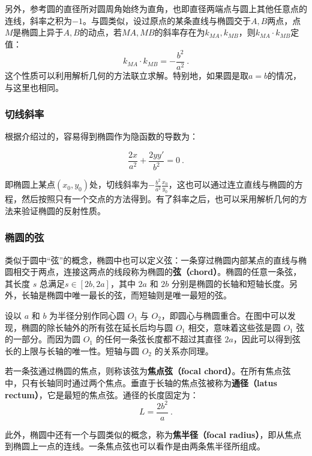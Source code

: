 另外，参考圆的直径所对圆周角始终为直角，也即直径两端点与圆上其他任意点的连线，斜率之积为$-1$。与圆类似，设过原点的某条直线与椭圆交于$A,B$两点，点$M$是椭圆上异于$A,B$的动点，若$MA,MB$的斜率存在为$k_{MA},k_{MB}$，则$k_{MA}\cdot k_{MB}$定值：
\begin{equation}
k_{MA} \cdot k_{MB} = -\frac{b^2}{a^2}~.
\end{equation}
这个性质可以利用解析几何的方法联立求解。特别地，如果圆是取$a=b$的情况，与这里也相同。

\subsubsection{切线斜率}

根据介绍过的，容易得到椭圆作为隐函数的导数为：

\begin{equation}
\frac{2x}{a^2} + \frac{2yy'}{b^2} = 0~.
\end{equation}

即椭圆上某点$(x_0,y_0)$处，切线斜率为$\displaystyle-\frac{b^2}{a^2}\frac{x_0}{y_0}$，这也可以通过连立直线与椭圆的方程，然后按照只有一个交点的方法得到。有了斜率之后，也可以采用解析几何的方法来验证椭圆的反射性质。

\subsubsection{椭圆的弦}

类似于圆中“弦”的概念，椭圆中也可以定义弦：一条穿过椭圆内部某点的直线与椭圆相交于两点，连接这两点的线段称为椭圆的\textbf{弦（chord）}。椭圆的任意一条弦，其长度 $s$ 总满足$s \in [2b, 2a]$，其中 $2a$ 和 $2b$ 分别是椭圆的长轴和短轴长度。另外，长轴是椭圆中唯一最长的弦，而短轴则是唯一最短的弦。


设以 $a$ 和 $b$ 为半径分别作同心圆 $O_1$ 与 $O_2$，即圆心与椭圆重合。在图中可以发现，椭圆的除长轴外的所有弦在延长后均与圆 $O_1$ 相交，意味着这些弦是圆 $O_1$ 弦的一部分。而因为圆 $O_1$ 的任何一条弦长度都不超过其直径 $2a$，因此可以得到弦长的上限与长轴的唯一性。短轴与圆 $O_2$ 的关系亦同理。

若一条弦通过椭圆的焦点，则称该弦为\textbf{焦点弦（focal chord）}。在所有焦点弦中，只有长轴同时通过两个焦点。垂直于长轴的焦点弦被称为\textbf{通径（latus rectum）}，它是最短的焦点弦。通径的长度固定为：
\begin{equation}
L = \frac{2b^2}{a}~.
\end{equation}

此外，椭圆中还有一个与圆类似的概念，称为\textbf{焦半径（focal radius）}，即从焦点到椭圆上一点的连线。一条焦点弦也可以看作是由两条焦半径所组成。

